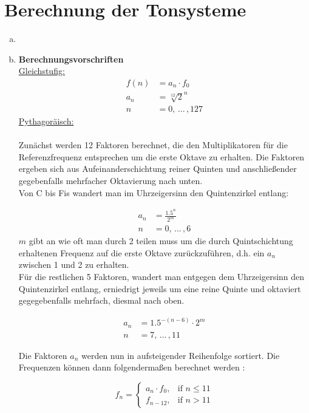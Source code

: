 \chapter{Berechnung der Tonsysteme}

\begin{enumerate}[a)]
\item

\item
\textbf{Berechnungsvorschriften} \\

\underline{Gleichstufig:}
\\
\begin{align*}
    f(n) &= a_n \cdot f_0 \\ 
    a_n &= \sqrt[12]{2}^n \\
    n &= 0, \,... \, ,127
\end{align*} 
\underline{Pythagoräisch:}
\\
\\
Zunächst werden 12 Faktoren berechnet, die den Multiplikatoren für die Referenzfrequenz entsprechen um die erste Oktave zu erhalten.
Die Faktoren ergeben sich aus Aufeinanderschichtung reiner Quinten und anschließender gegebenfalls mehrfacher Oktavierung nach unten.
\\
Von C bis Fis wandert man im Uhrzeigersinn den Quintenzirkel entlang:

\begin{align*}
    a_n &= \frac{1.5^n}{2^m} \\
    n &= 0,  \,... \, ,6
\end{align*} 
$m$ gibt an wie oft man durch 2 teilen muss um die durch Quintschichtung erhaltenen Frequenz auf die erste Oktave zurückzuführen, d.h. ein $a_n$ zwischen 1 und 2 zu erhalten.
\\

Für die restlichen 5 Faktoren, wandert man entgegen dem Uhrzeigersinn den Quintenzirkel entlang, erniedrigt jeweils um eine reine Quinte und oktaviert gegegebenfalls mehrfach, diesmal nach oben.

\begin{align*}
    a_n &= 1.5^{-(n-6)} \cdot 2^m \\
    n &= 7, \, ... \, ,11 
\end{align*}

Die Faktoren $a_n$ werden nun in aufsteigender Reihenfolge sortiert. Die Frequenzen können dann folgendermaßen berechnet werden :

\[
    f_n = 
\begin{cases}
    a_n \cdot f_0,& \text{if } n\leq 11 \\
    f_{n-12},&\text{if } n> 11
\end{cases}  
\]


\end{enumerate}
